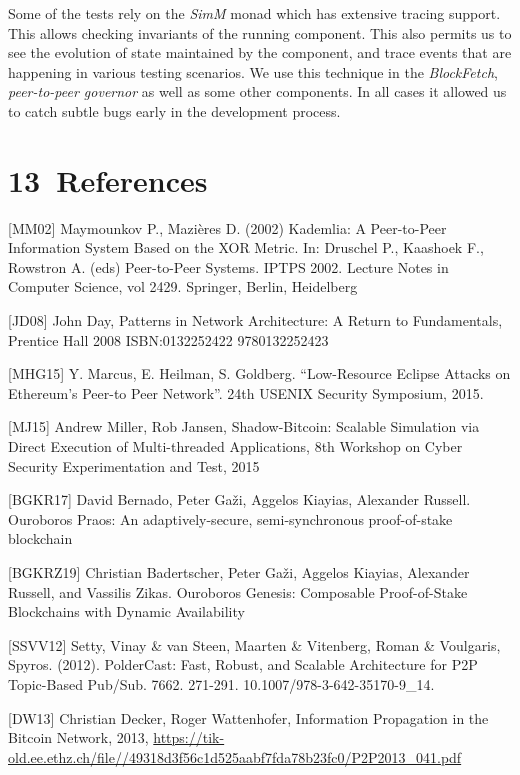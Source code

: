 \documentclass[]{article}
\begin{document}
Some of the tests rely on the \emph{SimM} monad which has extensive
tracing support. This allows checking invariants of the running
component. This also permits us to see the evolution of state maintained
by the component, and trace events that are happening in various testing
scenarios. We use this technique in the \emph{BlockFetch},
\emph{peer-to-peer governor} as well as some other components. In all
cases it allowed us to catch subtle bugs early in the development
process.

\hypertarget{references}{%
\section{​13​~References}\label{references}}

{[}MM02{]} Maymounkov P., Mazières D. (2002) Kademlia: A Peer-to-Peer
Information System Based on the XOR Metric. In: Druschel P., Kaashoek
F., Rowstron A. (eds) Peer-to-Peer Systems. IPTPS 2002. Lecture Notes in
Computer Science, vol 2429. Springer, Berlin, Heidelberg

{[}JD08{]} John Day, Patterns in Network Architecture: A Return to
Fundamentals, Prentice Hall 2008 ISBN:0132252422 9780132252423

{[}MHG15{]} Y. Marcus, E. Heilman, S. Goldberg. ``Low-Resource Eclipse
Attacks on Ethereum's Peer-to Peer Network''. 24th USENIX Security
Symposium, 2015.

{[}MJ15{]} Andrew Miller, Rob Jansen, Shadow-Bitcoin: Scalable
Simulation via Direct Execution of Multi-threaded Applications, 8th
Workshop on Cyber Security Experimentation and Test, 2015

{[}BGKR17{]} David Bernado, Peter Gaži, Aggelos Kiayias, Alexander
Russell. Ouroboros Praos: An adaptively-secure, semi-synchronous
proof-of-stake blockchain

{[}BGKRZ19{]} Christian Badertscher, Peter Gaži, Aggelos Kiayias,
Alexander Russell, and Vassilis Zikas. Ouroboros Genesis: Composable
Proof-of-Stake Blockchains with Dynamic Availability

{[}SSVV12{]} Setty, Vinay \& van Steen, Maarten \& Vitenberg, Roman \&
Voulgaris, Spyros. (2012). PolderCast: Fast, Robust, and Scalable
Architecture for P2P Topic-Based Pub/Sub. 7662. 271-291.
10.1007/978-3-642-35170-9\_14.

{[}DW13{]} Christian Decker, Roger Wattenhofer, Information Propagation
in the Bitcoin Network, 2013,
\href{https://tik-old.ee.ethz.ch/file//49318d3f56c1d525aabf7fda78b23fc0/P2P2013_041.pdf}{{https://tik-old.ee.ethz.ch/file//49318d3f56c1d525aabf7fda78b23fc0/P2P2013\_041.pdf}}
\end{document}
